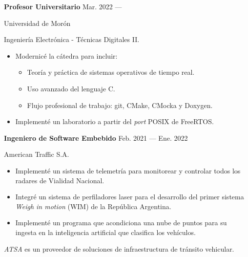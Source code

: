 \bigskip
\parbox[t][][t]{\linewidth}{
	\parbox{\linewidth}{
		\textbf{Profesor Universitario}
			\hfill
			{Mar. 2022 --- \phantom{Dic. 2099}}
		}
	\smallbreak
	\parbox{\linewidth}{Universidad de Morón}
	\smallbreak
	Ingeniería Electrónica - Técnicas Digitales II.
	\begin{itemize}
	    \item{Modernicé la cátedra para incluir:}
		\begin{itemize}
			\item{Teoría y práctica de sistemas operativos de tiempo real.}
			\item{Uso avanzado del lenguaje C.}
			\item{Flujo profesional de trabajo: git, CMake, CMocka y Doxygen.}
		\end{itemize}
		\item{Implementé un laboratorio a partir del \emph{port} POSIX de FreeRTOS.}
	\end{itemize}
}

\bigskip
\parbox[t][][t]{\linewidth}{
	\parbox{\linewidth}{
		\textbf{Ingeniero de Software Embebido}
			\hfill
			{Feb. 2021 --- Ene. 2022}
		}
	\smallbreak
	\parbox{\linewidth}{American Traffic S.A.}
	\smallbreak
	\begin{itemize}
	    \item{Implementé un sistema de telemetría para monitorear y controlar todos los radares de Vialidad Nacional.}
	    \item{Integré un sistema de perfiladores laser para el desarrollo del primer sistema \emph{Weigh in motion} (WIM) de la República Argentina.}
		\item{Implementé un programa que acondiciona una nube de puntos para su ingesta en la inteligencia artificial que clasifica los vehículos.}
	\end{itemize}
	\smallbreak
    \emph{ATSA} es un proveedor de soluciones de infraestructura de tránsito vehicular.
}

\bigskip
%

